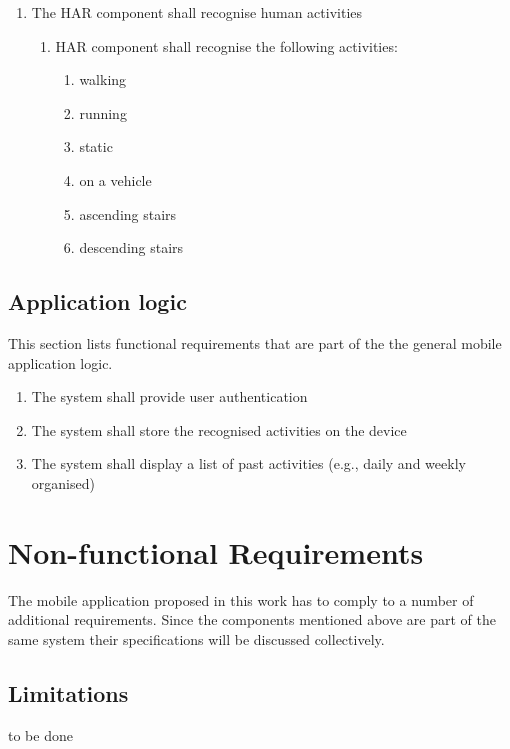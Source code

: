     \begin{enumerate}
        \item The HAR component shall recognise human activities
        \begin{enumerate}
            \item HAR component shall recognise the following activities:
            \begin{enumerate}
                \item walking
                \item running
                \item static
                \item on a vehicle
                \item ascending stairs
                \item descending stairs
            \end{enumerate}
        \end{enumerate}
    \end{enumerate}
    
    \subsection{Application logic}
    This section lists functional requirements that are part of the the general mobile application logic.
    \begin{enumerate}
        \item The system shall provide user authentication
        \item The system shall store the recognised activities on the device
        \item The system shall display a list of past activities (e.g., daily and weekly organised)
    \end{enumerate}

\section{Non-functional Requirements}
The mobile application proposed in this work has to comply to a number of additional requirements. Since the components mentioned above are part of the same system their specifications will be discussed collectively.

    \subsection{Limitations}
    to be done
    
